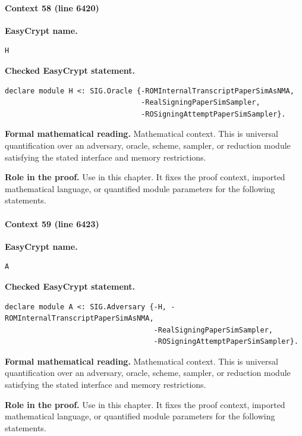 \paragraph{Context 58 (line 6420)}
\noindent\textbf{EasyCrypt name.}
\begin{lstlisting}[language=EasyCrypt,basicstyle=\ttfamily\scriptsize]
H
\end{lstlisting}
\noindent\textbf{Checked EasyCrypt statement.}
\begin{lstlisting}[language=EasyCrypt,basicstyle=\ttfamily\scriptsize]
declare module H <: SIG.Oracle {-ROMInternalTranscriptPaperSimAsNMA,
                                -RealSigningPaperSimSampler,
                                -ROSigningAttemptPaperSimSampler}.
\end{lstlisting}
\noindent\textbf{Formal mathematical reading.}
Mathematical context. This is universal quantification over an adversary, oracle, scheme, sampler, or reduction module satisfying the stated interface and memory restrictions.

\noindent\textbf{Role in the proof.}
Use in this chapter. It fixes the proof context, imported mathematical language, or quantified module parameters for the following statements.

\paragraph{Context 59 (line 6423)}
\noindent\textbf{EasyCrypt name.}
\begin{lstlisting}[language=EasyCrypt,basicstyle=\ttfamily\scriptsize]
A
\end{lstlisting}
\noindent\textbf{Checked EasyCrypt statement.}
\begin{lstlisting}[language=EasyCrypt,basicstyle=\ttfamily\scriptsize]
declare module A <: SIG.Adversary {-H, -ROMInternalTranscriptPaperSimAsNMA,
                                   -RealSigningPaperSimSampler,
                                   -ROSigningAttemptPaperSimSampler}.
\end{lstlisting}
\noindent\textbf{Formal mathematical reading.}
Mathematical context. This is universal quantification over an adversary, oracle, scheme, sampler, or reduction module satisfying the stated interface and memory restrictions.

\noindent\textbf{Role in the proof.}
Use in this chapter. It fixes the proof context, imported mathematical language, or quantified module parameters for the following statements.

